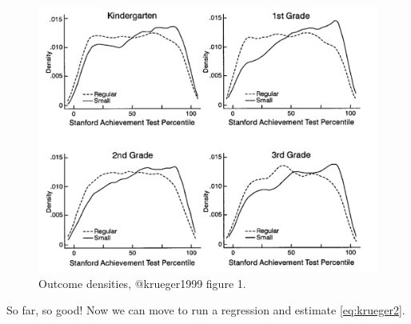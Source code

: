 \documentclass[]{book}
\begin{document}
\begin{figure}

{\centering \includegraphics[width=26.03in]{images/krueger1} 

}

\caption{Outcome densities, @krueger1999 figure 1.}\label{fig:kruegerdens}
\end{figure}

So far, so good! Now we can move to run a regression and estimate \eqref{eq:krueger2}.
\end{document}
